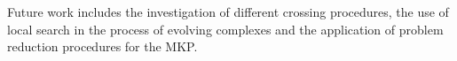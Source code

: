 Future work includes the investigation of different crossing procedures,
the use of local search in the process of evolving complexes and the
application of problem reduction procedures for the MKP.
